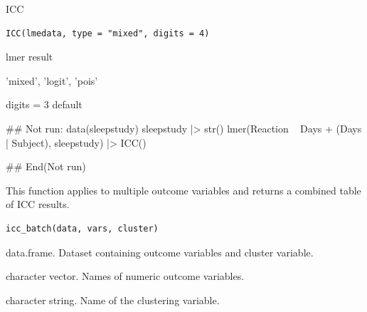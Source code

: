 \documentclass[a4paper]{book}
\begin{document}
%
\begin{Description}
ICC
\end{Description}
%
\begin{Usage}
\begin{verbatim}
ICC(lmedata, type = "mixed", digits = 4)
\end{verbatim}
\end{Usage}
%
\begin{Arguments}
\begin{ldescription}
\item[\code{lmedata}] lmer result

\item[\code{type}] 'mixed', 'logit', 'pois'

\item[\code{digits}] digits = 3 default
\end{ldescription}
\end{Arguments}
%
\begin{Examples}
\begin{ExampleCode}
\#\# Not run: 
data(sleepstudy)
sleepstudy |> str()
lmer(Reaction ~ Days + (Days | Subject), sleepstudy) |> ICC()



## End(Not run)
\end{ExampleCode}
\end{Examples}
%
\begin{Description}
This function applies  to multiple outcome variables
and returns a combined table of ICC results.
\end{Description}
%
\begin{Usage}
\begin{verbatim}
icc_batch(data, vars, cluster)
\end{verbatim}
\end{Usage}
%
\begin{Arguments}
\begin{ldescription}
\item[\code{data}] data.frame. Dataset containing outcome variables and cluster variable.

\item[\code{vars}] character vector. Names of numeric outcome variables.

\item[\code{cluster}] character string. Name of the clustering variable.
\end{ldescription}
\end{Arguments}
\end{document}
